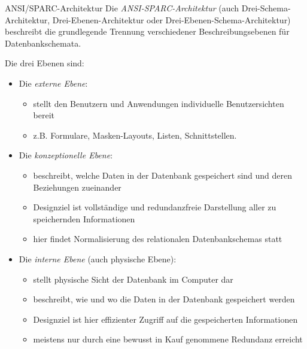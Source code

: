 \begin{defi}{ANSI/SPARC-Architektur}
    Die \emph{ANSI-SPARC-Architektur} (auch Drei-Schema-Architektur, Drei-Ebenen-Architektur oder Drei-Ebenen-Schema-Architektur) beschreibt die grundlegende Trennung verschiedener Beschreibungsebenen für Datenbankschemata.

    Die drei Ebenen sind:
    \begin{itemize}
        \item Die \emph{externe Ebene}:
              \begin{itemize}
                  \item stellt den Benutzern und Anwendungen individuelle Benutzersichten bereit
                  \item z.B. Formulare, Masken-Layouts, Listen, Schnittstellen.
              \end{itemize}
        \item Die \emph{konzeptionelle Ebene}:
              \begin{itemize}
                  \item beschreibt, welche Daten in der Datenbank gespeichert sind und deren Beziehungen zueinander
                  \item Designziel ist vollständige und redundanzfreie Darstellung aller zu speichernden Informationen
                  \item hier findet Normalisierung des relationalen Datenbankschemas statt
              \end{itemize}
        \item Die \emph{interne Ebene} (auch physische Ebene):
              \begin{itemize}
                  \item stellt physische Sicht der Datenbank im Computer dar
                  \item beschreibt, wie und wo die Daten in der Datenbank gespeichert werden
                  \item Designziel ist hier  effizienter Zugriff auf die gespeicherten Informationen
                  \item meistens nur durch eine bewusst in Kauf genommene Redundanz erreicht
              \end{itemize}
    \end{itemize}


\end{defi}
